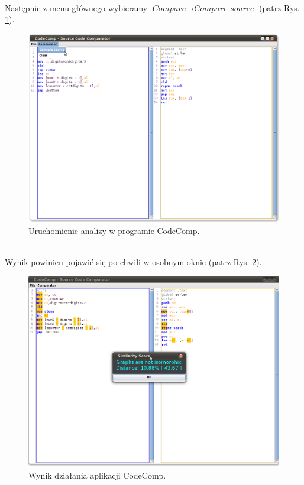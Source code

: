 \documentclass[a4paper,12pt,twoside]{article}
\begin{document}
\pagebreak
\\
Następnie z menu głównego wybieramy $\textit{Compare} \rightarrow \textit{Compare source}$ (patrz Rys. \ref{fig:compare}).
\begin{figure}[here]
\centering
\includegraphics[scale=0.3]{gfx/compare_source.png}
\caption{Uruchomienie analizy w programie CodeComp.}
\label{fig:compare}
\end{figure}
\\
Wynik powinien pojawić się po chwili w osobnym oknie (patrz Rys. \ref{fig:score}).
\begin{figure}[!]
\centering
\includegraphics[scale=0.3]{gfx/compare_score.png}
\caption{Wynik działania aplikacji CodeComp.}
\label{fig:score}
\end{figure}
\end{document}
